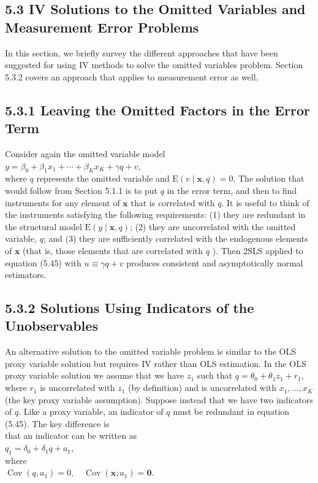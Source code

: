 \documentclass[10pt]{article}
\begin{document}
\subsection*{5.3 IV Solutions to the Omitted Variables and Measurement Error Problems}
In this section, we briefly survey the different approaches that have been suggested for using IV methods to solve the omitted variables problem. Section 5.3.2 covers an approach that applies to measurement error as well.

\subsection*{5.3.1 Leaving the Omitted Factors in the Error Term}
Consider again the omitted variable model\\
$y=\beta_{0}+\beta_{1} x_{1}+\cdots+\beta_{K} x_{K}+\gamma q+v$,\\
where $q$ represents the omitted variable and $\mathrm{E}(v \mid \mathbf{x}, q)=0$. The solution that would follow from Section 5.1.1 is to put $q$ in the error term, and then to find instruments for any element of $\mathbf{x}$ that is correlated with $q$. It is useful to think of the instruments satisfying the following requirements: (1) they are redundant in the structural model $\mathrm{E}(y \mid \mathbf{x}, q)$; (2) they are uncorrelated with the omitted variable, $q$; and (3) they are sufficiently correlated with the endogenous elements of $\mathbf{x}$ (that is, those elements that are correlated with $q$ ). Then 2SLS applied to equation (5.45) with $u \equiv \gamma q+v$ produces consistent and asymptotically normal estimators.

\subsection*{5.3.2 Solutions Using Indicators of the Unobservables}
An alternative solution to the omitted variable problem is similar to the OLS proxy variable solution but requires IV rather than OLS estimation. In the OLS proxy variable solution we assume that we have $z_{1}$ such that $q=\theta_{0}+\theta_{1} z_{1}+r_{1}$, where $r_{1}$ is uncorrelated with $z_{1}$ (by definition) and is uncorrelated with $x_{1}, \ldots, x_{K}$ (the key proxy variable assumption). Suppose instead that we have two indicators of $q$. Like a proxy variable, an indicator of $q$ must be redundant in equation (5.45). The key difference is\\
that an indicator can be written as\\
$q_{1}=\delta_{0}+\delta_{1} q+a_{1}$,\\
where\\
$\operatorname{Cov}\left(q, a_{1}\right)=0, \quad \operatorname{Cov}\left(\mathbf{x}, a_{1}\right)=\mathbf{0}$.
\end{document}

